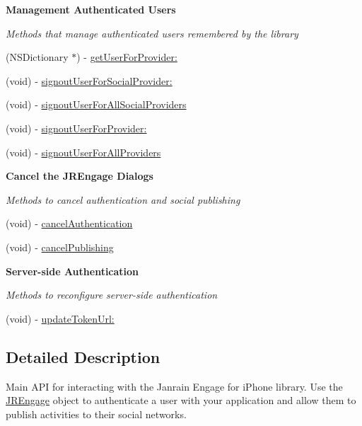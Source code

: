 \begin{Indent}{\bf Management Authenticated Users}\par
{\em \label{_amgrp4247d2361fbfb57c620ed69782a50c95}
 Methods that manage authenticated users remembered by the library }\begin{DoxyCompactItemize}
\item 
(NSDictionary $\ast$) -\/ \hyperlink{interface_j_r_engage_a5da20d7a5a1022db057819dc3b771192}{getUserForProvider:}
\item 
(void) -\/ \hyperlink{interface_j_r_engage_aede9ed92d80f14d85e59a982da3150fc}{signoutUserForSocialProvider:}
\item 
(void) -\/ \hyperlink{interface_j_r_engage_a1f4e27ed5dbc05892fd7bc2255d2afa8}{signoutUserForAllSocialProviders}
\item 
(void) -\/ \hyperlink{interface_j_r_engage_af1448791663265d3b739041983fbae92}{signoutUserForProvider:}
\item 
(void) -\/ \hyperlink{interface_j_r_engage_a56060e8d5fe94e4bf06ff3edf27af5ee}{signoutUserForAllProviders}
\end{DoxyCompactItemize}
\end{Indent}
\begin{Indent}{\bf Cancel the JREngage Dialogs}\par
{\em \label{_amgrpd07ee85d05cc5dd13dd0e31682479a39}
 Methods to cancel authentication and social publishing }\begin{DoxyCompactItemize}
\item 
(void) -\/ \hyperlink{interface_j_r_engage_a17b67c9bb98230fb7d59f8c35a20662b}{cancelAuthentication}
\item 
(void) -\/ \hyperlink{interface_j_r_engage_a205c368338061976178a5b0e36f2d4f2}{cancelPublishing}
\end{DoxyCompactItemize}
\end{Indent}
\begin{Indent}{\bf Server-\/side Authentication}\par
{\em \label{_amgrp1fc6cae7bdf84f91a0bad45f5891f15e}
 Methods to reconfigure server-\/side authentication }\begin{DoxyCompactItemize}
\item 
(void) -\/ \hyperlink{interface_j_r_engage_ac0fb45ee43767dfdea0057bb93000db6}{updateTokenUrl:}
\end{DoxyCompactItemize}
\end{Indent}


\subsection{Detailed Description}
Main API for interacting with the Janrain Engage for iPhone library. Use the \hyperlink{interface_j_r_engage}{JREngage} object to authenticate a user with your application and allow them to publish activities to their social networks.

